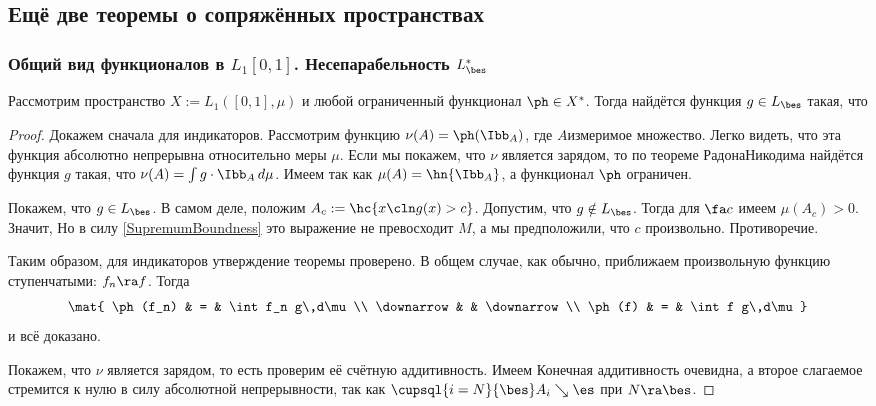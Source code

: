 \documentclass[a4paper]{article}
\begin{document}
\subsection{Ещё две теоремы о сопряжённых пространствах}

\subsubsection{Общий вид функционалов в $L_1[0,1]$. Несепарабельность $L_\bes^*$}

\begin{theorem}
Рассмотрим пространство $X := L_1([0,1],\mu)$ и любой ограниченный функционал $\ph\in X^*$. Тогда найдётся
функция $g \in L_\bes$ такая, что
\end{theorem}
\begin{proof}
Докажем сначала для индикаторов. Рассмотрим функцию $\nu(A) = \ph(\Ibb_A)$, где $A$\т измеримое множество.
Легко видеть, что эта функция абсолютно непрерывна относительно меры $\mu$. Если мы покажем, что $\nu$ является зарядом, то
по теореме Радона\ч Никодима найдётся функция $g$ такая, что $\nu(A) = \int g \cdot \Ibb_A \,d\mu$.
Имеем
так как $\mu(A) = \hn{\Ibb_A}$, а функционал $\ph$ ограничен.

Покажем, что $g \in L_\bes$. В самом деле, положим $A_c := \hc{x\cln g(x) > c}$. Допустим, что $g \notin L_\bes$. Тогда
для $\fa c$ имеем $\mu(A_c) > 0$. Значит,
Но в силу \eqref{SupremumBoundness} это выражение не превосходит $M$, а мы предположили, что $c$ произвольно.
Противоречие.

Таким образом, для индикаторов утверждение теоремы проверено. В общем случае, как обычно, приближаем
произвольную функцию ступенчатыми: $f_n\ra f$. Тогда
$$\mat{
\ph(f_n) & = & \int f_n g\,d\mu\\
\downarrow &  & \downarrow \\
\ph(f) & = & \int f g\,d\mu}
$$
и всё доказано.

Покажем, что $\nu$ является зарядом, то есть проверим её счётную аддитивность. Имеем
Конечная аддитивность очевидна, а второе слагаемое стремится к нулю в силу абсолютной непрерывности, так как
$\cupsql{i=N}{\bes}A_i \searrow \es$ при $N\ra \bes$.
\end{proof}
\end{document}
